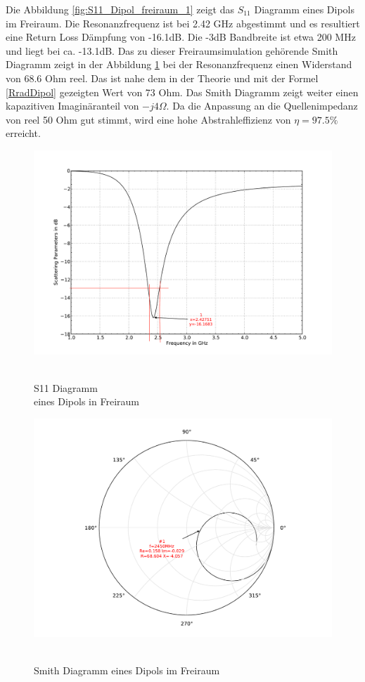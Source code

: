 Die Abbildung \ref{fig:S11_Dipol_freiraum_1} zeigt das $S_{11}$ Diagramm eines Dipols im Freiraum. Die Resonanzfrequenz ist bei 2.42 GHz abgestimmt und es resultiert eine Return Loss Dämpfung von -16.1dB. Die -3dB Bandbreite ist etwa 200 MHz und liegt bei ca. -13.1dB. Das zu dieser Freiraumsimulation gehörende Smith Diagramm zeigt in der Abbildung \ref{fig:Smith_Dipol_freiraum_2}  bei der Resonanzfrequenz einen Widerstand von 68.6 Ohm reel. Das ist nahe dem in der Theorie und mit der Formel \ref{RradDipol} gezeigten Wert von 73 Ohm. Das Smith Diagramm zeigt weiter einen kapazitiven  Imaginäranteil von $-j4\Omega$. Da die Anpassung an die Quellenimpedanz von reel 50 Ohm gut stimmt, wird eine hohe Abstrahleffizienz von $\eta = 97.5 \% $ erreicht.
\begin{figure}[!h]
\begin{center}
  \includegraphics[width=\linewidth]{content/bilder/Evaluation/Dipol/S11DipolOhneABS.pdf}
  \caption{\\S11 Diagramm \\eines Dipols in Freiraum}\label{fig:S11_Dipol_freiraum_1}
\endminipage%
{}
  \includegraphics[width=\linewidth]{content/bilder/Evaluation/Dipol/SmithDipolOhneABS.pdf}
  \caption{\\Smith Diagramm eines Dipols im Freiraum}\label{fig:Smith_Dipol_freiraum_2}
\endminipage
\end{center}
\end{figure}

